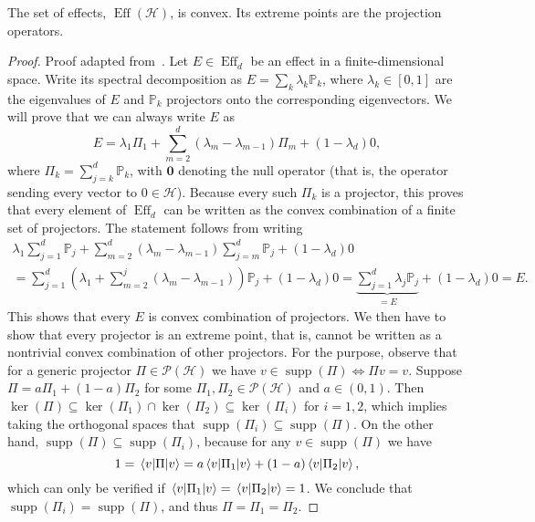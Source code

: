\documentclass[a4paper]{report}
\newcommand{\PP}{\mathbb{P}}
\newcommand{\on}[1]{\operatorname{#1}}
\newcommand{\bs}[1]{\boldsymbol{#1}}
\newcommand{\calH}{{\mathcal{H}}}
\newcommand{\calP}{{\mathcal{P}}}
\begin{document}
\begin{prop}
	The set of effects, $\on{Eff}(\calH)$, is convex. Its extreme points are the projection operators.
\end{prop}
\begin{proof}
	Proof adapted from~\parencite{caves2004gleasontype}.
	Let $E\in\on{Eff}_d$ be an effect in a finite-dimensional space.
	Write its spectral decomposition as
	$E = \sum_k \lambda_k \PP_k$, where $\lambda_k\in[0,1]$ are the eigenvalues of $E$ and $\PP_k$ projectors onto the corresponding eigenvectors.
	We will prove that we can always write $E$ as
	\begin{equation}
		E = \lambda_1 \Pi_1 + \sum_{m=2}^d (\lambda_m-\lambda_{m-1})\Pi_m + (1-\lambda_d) 0,
	\end{equation}
	where $\Pi_k=\sum_{j=k}^d\PP_k$, with $\bs 0$ denoting the null operator (that is, the operator sending every vector to $0\in\calH$).
	Because every such $\Pi_k$ is a projector, this proves that every element of $\on{Eff}_d$ can be written as the convex combination of a finite set of projectors.
	The statement follows from writing
	\begin{equation}
	\begin{gathered}
		\lambda_1\sum_{j=1}^d \PP_j
		+ \sum_{m=2}^d(\lambda_m-\lambda_{m-1})\sum_{j=m}^d \PP_j
		+ (1-\lambda_d)0 \\
		= \sum_{j=1}^d \left(\lambda_1 + \sum_{m=2}^j (\lambda_m-\lambda_{m-1})\right) \PP_j
		+ (1-\lambda_d) 0
		= \underbrace{\sum_{j=1}^d \lambda_j \PP_j}_{=E} + (1-\lambda_d) 0 = E.
	\end{gathered}
	\end{equation}
	This shows that every $E$ is convex combination of projectors. We then have to show that every projector is an extreme point, that is, cannot be written as a nontrivial convex combination of other projectors.
	For the purpose, observe that for a generic projector $\Pi\in\calP(\calH)$ we have $v\in\on{supp}(\Pi)\Longleftrightarrow \Pi v=v$.
	Suppose $\Pi=a\Pi_1+(1-a)\Pi_2$ for some $\Pi_1,\Pi_2\in\calP(\calH)$ and $a\in(0,1)$.
	Then $\ker(\Pi)\subseteq\ker(\Pi_1)\cap\ker(\Pi_2)\subseteq\ker(\Pi_i)$ for $i=1,2$, which implies taking the orthogonal spaces that $\on{supp}(\Pi_i)\subseteq\on{supp}(\Pi)$.
	On the other hand, $\on{supp}(\Pi)\subseteq\on{supp}(\Pi_i)$, because for any $v\in\on{supp}(\Pi)$ we have
	\begin{equation}
		1 = \mel{v}{\Pi}{v}
		= a\mel{v}{\Pi_1}{v} + (1-a) \mel{v}{\Pi_2}{v},
	\end{equation}
	which can only be verified if $\mel{v}{\Pi_1}{v}=\mel{v}{\Pi_2}{v}=1$.
	We conclude that $\on{supp}(\Pi_i)=\on{supp}(\Pi)$, and thus $\Pi=\Pi_1=\Pi_2$.
\end{proof}
\end{document}
